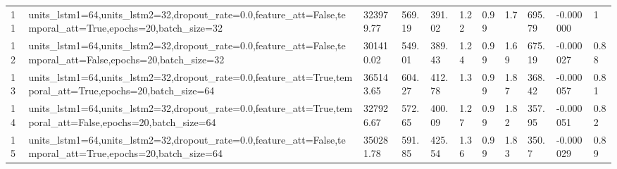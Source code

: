 \begin{longtable}{C{0.8cm} L{2cm} C{1.15cm} C{1.15cm} C{1.15cm} C{1.15cm} C{0.85cm} C{1.25cm} C{1.2cm} C{1.5cm} C{1.0cm}}
11 & units\_lstm1=64,\newline units\_lstm2=32,\newline dropout\_rate=0.0,\newline feature\_att=False,\newline temporal\_att=True,\newline epochs=20,\newline batch\_size=32 & 323979.77 & 569.19 & 391.02 & 1.22 & 0.99 & 1.7 & 695.79 & -0.000000 & 1 \\
12 & units\_lstm1=64,\newline units\_lstm2=32,\newline dropout\_rate=0.0,\newline feature\_att=False,\newline temporal\_att=False,\newline epochs=20,\newline batch\_size=32 & 301410.02 & 549.01 & 389.43 & 1.24 & 0.99 & 1.69 & 675.19 & -0.000027 & 0.88 \\
13 & units\_lstm1=64,\newline units\_lstm2=32,\newline dropout\_rate=0.0,\newline feature\_att=True,\newline temporal\_att=True,\newline epochs=20,\newline batch\_size=64 & 365143.65 & 604.27 & 412.78 & 1.3 & 0.99 & 1.87 & 368.42 & -0.000057 & 0.81 \\
14 & units\_lstm1=64,\newline units\_lstm2=32,\newline dropout\_rate=0.0,\newline feature\_att=True,\newline temporal\_att=False,\newline epochs=20,\newline batch\_size=64 & 327926.67 & 572.65 & 400.09 & 1.27 & 0.99 & 1.82 & 357.95 & -0.000051 & 0.82 \\
15 & units\_lstm1=64,\newline units\_lstm2=32,\newline dropout\_rate=0.0,\newline feature\_att=False,\newline temporal\_att=True,\newline epochs=20,\newline batch\_size=64 & 350281.78 & 591.85 & 425.54 & 1.36 & 0.99 & 1.83 & 350.7 & -0.000029 & 0.89 \\

\end{longtable}

